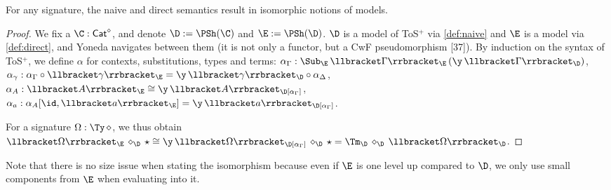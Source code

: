\setcounter{theorem}{21}
\begin{theorem}\label{thm:naive_direct}
  For any signature, the naive and direct semantics result in
  isomorphic notions of models.
\end{theorem}
\setcounter{theorem}{21}
\begin{proof}
  We fix a $\C:\mathsf{Cat}^\diamond$, and denote $\D := \PSh(\C)$ and
  $\E := \PSh(\D)$. $\D$ is a model of ToS$^+$
  via \autoref{def:naive} and $\E$ is a model via
  \autoref{def:direct}, and Yoneda navigates between them (it is not
  only a functor, but a CwF pseudomorphism
  [37]). By induction on the syntax of ToS$^+$, we define $\alpha$ for contexts,
  substitutions, types and terms: 
  $\alpha_\Gamma : \Sub_{\E}\,\llbracket\Gamma\rrbracket_\E\,(\y\,\llbracket\Gamma\rrbracket_\D)$,
  $\alpha_\gamma : \alpha_\Gamma\circ\llbracket\gamma\rrbracket_\E = \y\,\llbracket\gamma\rrbracket_\D\circ\alpha_\Delta$,
  $\alpha_A : \llbracket A\rrbracket_\E \cong \y\,\llbracket A\rrbracket_\D[\alpha_\Gamma]$,
  $\alpha_a : \alpha_A[\id,\llbracket a\rrbracket_\E] = \y\,\llbracket a\rrbracket_\D[\alpha_\Gamma]$.
  




  For a signature $\Omega:\Ty\,\diamond$, we thus obtain $\llbracket\Omega\rrbracket_\E\,\diamond_\D\,{\star} \cong \y\,\llbracket\Omega\rrbracket_\D[\alpha_\Gamma]\,\diamond_\D\,{\star} = \Tm_\D\,\diamond_\D\,\llbracket\Omega\rrbracket_\D$.
\end{proof}
Note that there is no size issue when stating the isomorphism because
even if $\E$ is one level up compared to $\D$, we only use small
components from $\E$ when evaluating into it.
